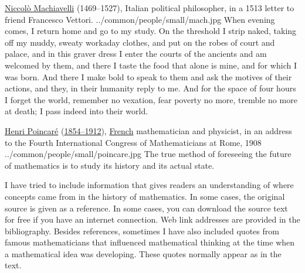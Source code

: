 \qboxnpq
  {
    \href{http://en.wikipedia.org/wiki/Niccol\%C3\%B2_Machiavelli}{Niccol\`o Machiavelli}
    (1469--1527), Italian political philosopher,
    in a 1513 letter to friend Francesco Vettori.
    \footnotemark
  }
  {../common/people/small/mach.jpg}
  {When evening comes, I return home and go to my study.
    On the threshold I strip naked, taking off my muddy, sweaty workaday clothes,
    and put on the robes of court and palace,
    and in this graver dress I enter the courts of the ancients and am welcomed by them,
    and there I taste the food that alone is mine, and for which I was born.
    And there I make bold to speak to them and ask the motives of their actions,
    and they, in their humanity reply to me.
    And for the space of four hours I forget the world, remember no vexation,
    fear poverty no more, tremble no more at death;
    I pass indeed into their world.}

\qboxnps
  {
    \href{http://www-history.mcs.st-andrews.ac.uk/Biographies/Poincare.html}
         {Henri Poincar\'e}
    (\href{http://www-history.mcs.st-andrews.ac.uk/Timelines/TimelineF.html}{1854--1912}),
    \href{http://www-history.mcs.st-andrews.ac.uk/BirthplaceMaps/Places/France.html}{French}
    mathematician and physicist,
    in an address to the Fourth International Congress of Mathematicians at Rome, 1908
    \footnotemark
  }
  {../common/people/small/poincare.jpg}
  {The true method of foreseeing the future of mathematics is to study its history
   and its actual state.}

I have tried to include information that gives readers an understanding of where
concepts came from in the history of mathematics.
In some cases, the original source is given as a reference.
In some cases, you can download the source text for free if you have an internet
connection. Web link addresses are provided in the bibliography.
Besides references,
sometimes I have also included quotes from famous mathematicians that
influenced mathematical thinking at the time when a mathematical idea was developing.
These quotes normally appear as
 in the text.


